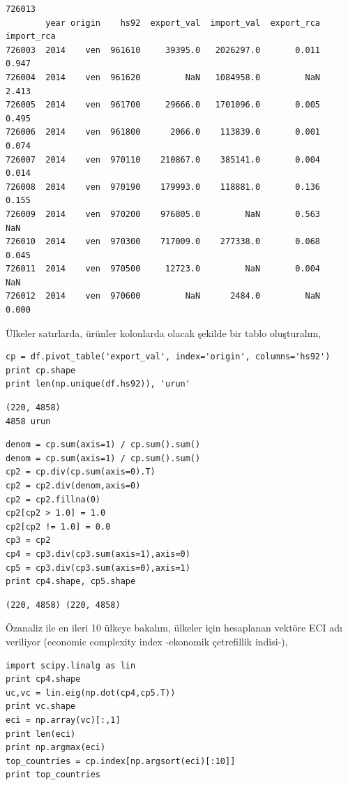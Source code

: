 \documentclass[12pt,fleqn]{article}\usepackage{../../common}
\begin{document}
\begin{verbatim}
726013
        year origin    hs92  export_val  import_val  export_rca  import_rca
726003  2014    ven  961610     39395.0   2026297.0       0.011       0.947
726004  2014    ven  961620         NaN   1084958.0         NaN       2.413
726005  2014    ven  961700     29666.0   1701096.0       0.005       0.495
726006  2014    ven  961800      2066.0    113839.0       0.001       0.074
726007  2014    ven  970110    210867.0    385141.0       0.004       0.014
726008  2014    ven  970190    179993.0    118881.0       0.136       0.155
726009  2014    ven  970200    976805.0         NaN       0.563         NaN
726010  2014    ven  970300    717009.0    277338.0       0.068       0.045
726011  2014    ven  970500     12723.0         NaN       0.004         NaN
726012  2014    ven  970600         NaN      2484.0         NaN       0.000
\end{verbatim}

Ülkeler satırlarda, ürünler kolonlarda olacak şekilde bir tablo oluşturalım,

\begin{verbatim}
cp = df.pivot_table('export_val', index='origin', columns='hs92')
print cp.shape
print len(np.unique(df.hs92)), 'urun'
\end{verbatim}

\begin{verbatim}
(220, 4858)
4858 urun
\end{verbatim}

\begin{verbatim}
denom = cp.sum(axis=1) / cp.sum().sum()
denom = cp.sum(axis=1) / cp.sum().sum()
cp2 = cp.div(cp.sum(axis=0).T)
cp2 = cp2.div(denom,axis=0)
cp2 = cp2.fillna(0)
cp2[cp2 > 1.0] = 1.0
cp2[cp2 != 1.0] = 0.0
cp3 = cp2
cp4 = cp3.div(cp3.sum(axis=1),axis=0)
cp5 = cp3.div(cp3.sum(axis=0),axis=1)
print cp4.shape, cp5.shape
\end{verbatim}

\begin{verbatim}
(220, 4858) (220, 4858)
\end{verbatim}

Özanaliz ile en ileri 10 ülkeye bakalım, ülkeler için hesaplanan vektöre
ECI adı veriliyor (economic complexity index -ekonomik çetrefillik
indisi-),

\begin{verbatim}
import scipy.linalg as lin
print cp4.shape
uc,vc = lin.eig(np.dot(cp4,cp5.T))
print vc.shape
eci = np.array(vc)[:,1]
print len(eci)
print np.argmax(eci)
top_countries = cp.index[np.argsort(eci)[:10]]
print top_countries
\end{verbatim}
\end{document}

